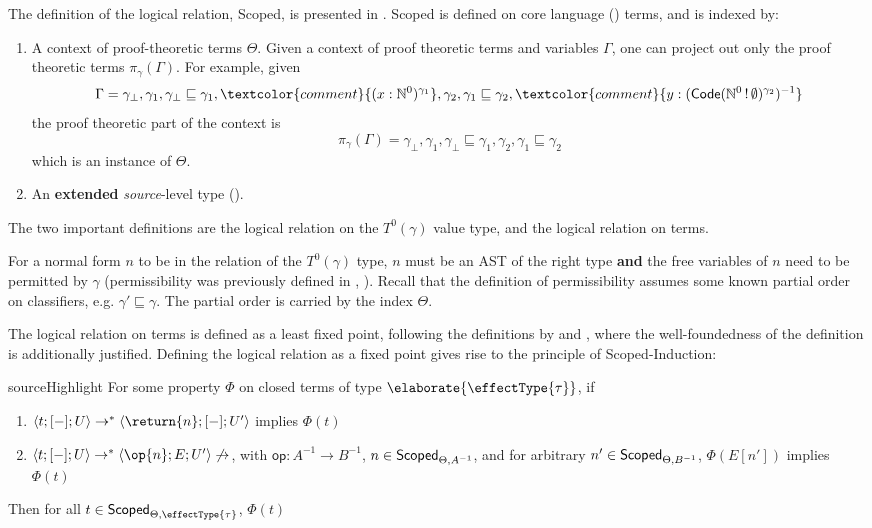The definition of the logical relation, \textsf{Scoped}, is presented in . \textsf{Scoped} is defined on core language (\coreLang{}) terms, and is indexed by:
\begin{enumerate}
  \item A context of proof-theoretic terms $\Theta$. Given a context of proof theoretic terms and variables $\Gamma$, one can project out only the proof theoretic terms $\pi_{\gamma}({\Gamma})$. For example, given 
  \[\Gamma = \gamma_\bot, \gamma_1, \gamma_\bot \sqsubseteq \gamma_1, \textcolor{comment}{(x:\mathbb{N}^0)^{\gamma_1}}, \gamma_2, \gamma_1 \sqsubseteq \gamma_2,  \textcolor{comment}{y:(\textsf{Code}(\mathbb{N}^0 \, ! \, \emptyset)^{\gamma_2})^{-1}}\]
  the proof theoretic part of the context is
  \[\pi_{\gamma}({\Gamma}) = \gamma_\bot, \gamma_1, \gamma_\bot \sqsubseteq \gamma_1, \gamma_2, \gamma_1 \sqsubseteq \gamma_2 \]
  which is an instance of $\Theta$.
  \item An \textbf{extended} \textit{source}-level type (). 
\end{enumerate}

The two important definitions are the logical relation on the $T^{0} (\gamma)$ value type, and the logical relation on terms. 

For a normal form $n$ to be in the relation of the $T^{0} (\gamma)$ type, $n$ must be an AST of the right type \textbf{and} the free variables of $n$ need to be permitted by $\gamma$ (permissibility was previously defined in , ). Recall that the definition of permissibility assumes some known partial order on classifiers, e.g. $\gamma' \sqsubseteq \gamma$. The partial order is carried by the index $\Theta$. 

The logical relation on terms is defined as a least fixed point, following the definitions by \citet{plotkin-2025} and \citet{kuchta-2023}, where the well-foundedness of the definition is additionally justified. Defining the logical relation as a fixed point gives rise to the principle of \textsf{Scoped}-Induction:

\begin{definition}{sourceHighlight}
  For some property $\Phi$ on closed terms of type $\elaborate{\effectType{\tau}}$, if
  \begin{enumerate}
    \item $\langle t; [-]; U \rangle \to^{*} \langle \return{n};[-];U' \rangle$ implies $\Phi(t)$
    \item $\langle t; [-]; U \rangle \to^{*} \langle \op{n};E;U' \rangle \not\to$, with $\textsf{op}: A^{-1} \to B^{-1}$, $n \in \textsf{Scoped}_{{\Theta}, {A^{-1}}}$, and for arbitrary $n' \in \textsf{Scoped}_{{\Theta}, {B^{-1}}}$, $\Phi(E[n'])$ implies $\Phi(t)$
  \end{enumerate}
  Then for all $t \in \scoped{\effectType{\tau}}$, $\Phi(t)$
\end{definition}

